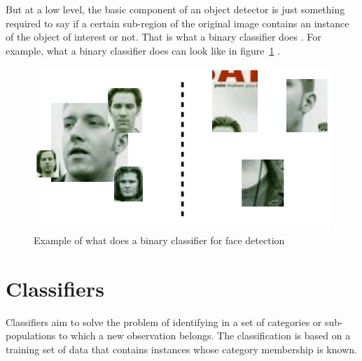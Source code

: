 \noindent But at a low level, the basic component of an object detector is just something required to say if a certain sub-region of the original image contains an instance of the object of interest or not. That is what a binary classifier does \cite{DIN08}. For example, what a binary classifier does can look like in figure~\ref{output_example_face_detection_binary_classifier} \cite{DIN08}.
\newline

\begin{figure}[!h]
\begin{center}
\noindent \includegraphics[scale=0.5]{figures/output_example_face_detection_binary_classifier} 
\newline
\caption{Example of what does a binary classifier for face detection}
\label{output_example_face_detection_binary_classifier}
\end{center} 
\end{figure}

\section{Classifiers}

\noindent Classifiers aim to solve the problem of identifying in a set of categories or sub-populations to which a new observation belongs. The classification is based on a training set of data that contains instances whose category membership is known. \cite{CLASS}
\newline









